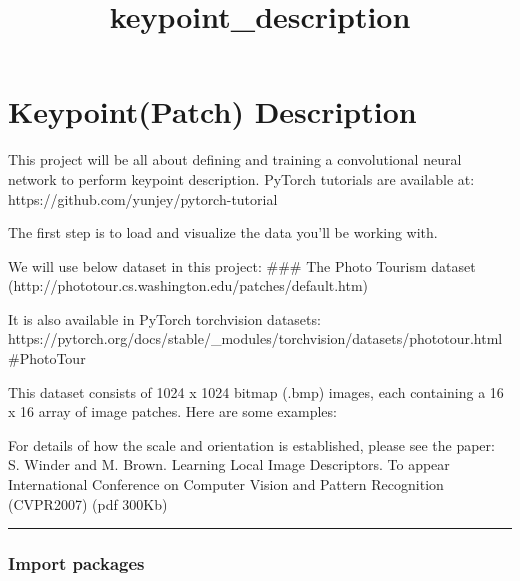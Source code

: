 \documentclass[11pt]{article}
\title{keypoint\_description}
\begin{document}
    
    
    \maketitle
    
    

    
    \hypertarget{keypointpatch-description}{%
\section{Keypoint(Patch) Description}\label{keypointpatch-description}}

This project will be all about defining and training a convolutional
neural network to perform keypoint description. PyTorch tutorials are
available at: https://github.com/yunjey/pytorch-tutorial

The first step is to load and visualize the data you'll be working with.

We will use below dataset in this project: \#\#\# The Photo Tourism
dataset (http://phototour.cs.washington.edu/patches/default.htm)

It is also available in PyTorch torchvision datasets:
https://pytorch.org/docs/stable/\_modules/torchvision/datasets/phototour.html\#PhotoTour

This dataset consists of 1024 x 1024 bitmap (.bmp) images, each
containing a 16 x 16 array of image patches. Here are some examples:

For details of how the scale and orientation is established, please see
the paper:\\

S. Winder and M. Brown. Learning Local Image Descriptors. To appear
International Conference on Computer Vision and Pattern Recognition
(CVPR2007) ({pdf 300Kb})

\begin{center}\rule{0.5\linewidth}{\linethickness}\end{center}

    \hypertarget{import-packages}{%
\subsubsection{Import packages}\label{import-packages}}
\end{document}
